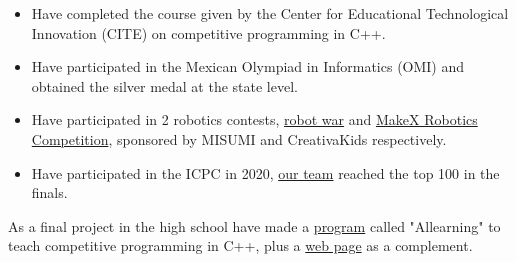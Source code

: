 \documentclass[10pt,a4paper,ragged2e,withhyper]{altacv}
\begin{document}
\begin{paracol}{2}
  \begin{itemize}
    \item Have completed the course given by the Center for Educational Technological Innovation (CITE) on competitive programming in C++.
    \item Have participated in the Mexican Olympiad in Informatics (OMI) and obtained the silver medal at the state level.
  \end{itemize}
  \divider
  \begin{itemize}
    \item Have participated in 2 robotics contests, {\href{https://drive.google.com/file/d/1xETjexZx_X1Bg46y_-m8kKneEbaz48dQ/view?usp=sharing}{\color{blue}robot war\color{black}}} and {\href{https://drive.google.com/file/d/1QcXzJbDVQ1dSvtQrdd_j387KvKlfXH8J/view?usp=sharing}{\color{blue}MakeX Robotics Competition\color{black}}}, sponsored by MISUMI and CreativaKids respectively.
  \end{itemize}
  \divider
  \begin{itemize}
    \item Have participated in the ICPC in 2020, {\href{https://drive.google.com/file/d/1OwYn_YItOoTw_DI-Dajlrwc_oC57Rv6G/view?usp=sharing}{\color{blue}our team\color{black}}} reached the top 100 in the finals.
  \end{itemize}

  \switchcolumn

  \divider

  {As a final project in the high school have made a {\href{https://github.com/KevinUrielAdler/Allearning}{\color{blue}program\color{black}}} called "Allearning" to teach competitive programming in C++, plus a {\href{https://github.com/KevinUrielAdler/Allearning-Web}{\color{blue}web page\color{black}}} as a complement.}
  \divider


\end{paracol}
\end{document}
